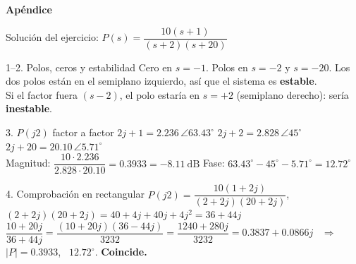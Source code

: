 \documentclass[aspectratio=169,11pt]{beamer}
\newcommand{\ang}[1]{\angle #1^\circ}
\begin{document}
\appendix
\begin{frame}
  \centering
  \vspace{1.2cm}
  {\Huge\bfseries Apéndice}
\end{frame}

\begin{frame}{Solución del ejercicio: $P(s)=\dfrac{10(s+1)}{(s+2)(s+20)}$}
  \footnotesize
  \setlength{\parskip}{1pt}
  \begin{block}{1--2. Polos, ceros y estabilidad}
    Cero en $s=-1$. Polos en $s=-2$ y $s=-20$. Los dos polos están en el semiplano izquierdo, así que el sistema es \textbf{estable}.\\
    Si el factor fuera $(s-2)$, el polo estaría en $s=+2$ (semiplano derecho): sería \textbf{inestable}.
  \end{block}
  \begin{block}{3. $P(j2)$ factor a factor}
    $2j+1=2.236\,\ang{63.43}$ \quad $2j+2=2.828\,\ang{45}$ \quad $2j+20=20.10\,\ang{5.71}$\\
    Magnitud: $\dfrac{10\cdot2.236}{2.828\cdot20.10}=0.3933=\boxed{-8.11\ \text{dB}}$ \qquad Fase: $63.43^\circ-45^\circ-5.71^\circ=\boxed{12.72^\circ}$
  \end{block}
  \begin{block}{4. Comprobación en rectangular}
    $P(j2)=\dfrac{10(1+2j)}{(2+2j)(20+2j)}$, \quad $(2+2j)(20+2j)=40+4j+40j+4j^2=36+44j$\\
    $\dfrac{10+20j}{36+44j}=\dfrac{(10+20j)(36-44j)}{3232}=\dfrac{1240+280j}{3232}=0.3837+0.0866j$ \ $\Rightarrow$ \ $|P|=0.3933$, \ $12.72^\circ$. \textbf{Coincide.}
  \end{block}
\end{frame}
\end{document}
